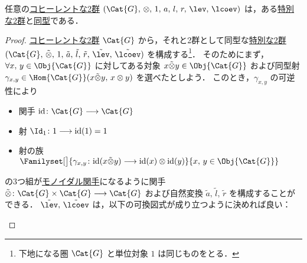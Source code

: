 \documentclass[TQFT_main]{subfiles}
\begin{document}
\begin{myprop}[label=prop:special2G]{}
    任意の\hyperref[def:W2G-C2G]{コヒーレントな2群} $(\Cat{G},\, \otimes,\, 1,\, a,\, l,\, r,\, \lev,\, \lcoev)$ は，ある\hyperref[def:special2G]{特別な2群}と\hyperref[def:hom2G]{同型}である．
\end{myprop}

\begin{proof}
    \hyperref[def:W2G-C2G]{コヒーレントな2群} $\Cat{G}$ から，それと2群として同型な\hyperref[def:special2G]{特別な2群} $(\Cat{G},\, \tilde{\otimes},\, 1,\, \tilde{a},\, \tilde{l},\, \tilde{r},\, \tilde{\lev},\, \tilde{\lcoev})$ を構成する\footnote{下地になる圏 $\Cat{G}$ と単位対象 $1$ は同じものをとる．}．
    そのためにまず，$\forall x,\, y \in \Obj{\Cat{G}}$ に対してある対象 $x \tilde{\otimes} y \in \Obj{\Cat{G}}$ および同型射 $\gamma_{x,y} \in \Hom{\Cat{G}}(x \tilde{\otimes}y,\, x\otimes y)$ を選べたとしよう．
    このとき，$\gamma_{x,y}$ の可逆性により
    \begin{itemize}
        \item 関手 $\mathrm{id} \colon \Cat{G} \lto \Cat{G}$
        \item 射 $\Id_1 \colon 1 \lto \mathrm{id}(1) = 1$
        \item 射の族 $\Familyset[\big]{\gamma_{x,y} \colon \mathrm{id}(x \tilde{\otimes} y) \lto \mathrm{id}(x) \otimes \mathrm{id}(y) }{x,\, y \in \Obj{\Cat{G}}}$
    \end{itemize}
    の3つ組が\hyperref[def:monoidal-functor]{モノイダル関手}になるように関手 $\tilde{\otimes} \colon \Cat{G} \times \Cat{G} \lto \Cat{G}$ および自然変換 $\tilde{a},\, \tilde{l},\, \tilde{r}$ を構成することができる．
    $\tilde{\lev},\, \tilde{\lcoev}$ は，以下の可換図式が成り立つように決めれば良い：
    \begin{center}


\end{center}
\end{proof}
\end{document}
